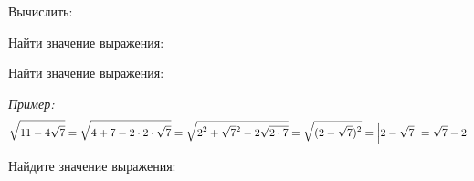 \begin{listofex}
	\item Вычислить:
	\begin{enumcols}[itemcolumns=3]
		\item {}
		\item {}
		\item {}
		\item {}
		\item {}
	\end{enumcols}
	\item Найти значение выражения:
	\begin{enumcols}[itemcolumns=2]
		\item {}
		\item {}
	\end{enumcols}
	\item Найти значение выражения:
	
	\textit{Пример:} \[ \sqrt{11-4\sqrt{7}}=\sqrt{4+7-2\cdot2\cdot\sqrt{7}}=\sqrt{\displaystyle2\mathstrut^2+\sqrt{7}\mathstrut^2-2\sqrt{2\cdot7}}=\sqrt{\displaystyle(2-\sqrt{7})^2}=\left|2-\sqrt{7}\right|=\sqrt{7} - 2 \]
	\begin{enumcols}[itemcolumns=2]
		\item {}
		\item {}
	\end{enumcols}
	\item Найдите значение выражения:
	\begin{enumcols}[itemcolumns=2]
		\item {}
		\item {}
		\item {}
	\end{enumcols}
	\item {}
	\item {}
	\item {}
	\item {}
	\item {}
\end{listofex}